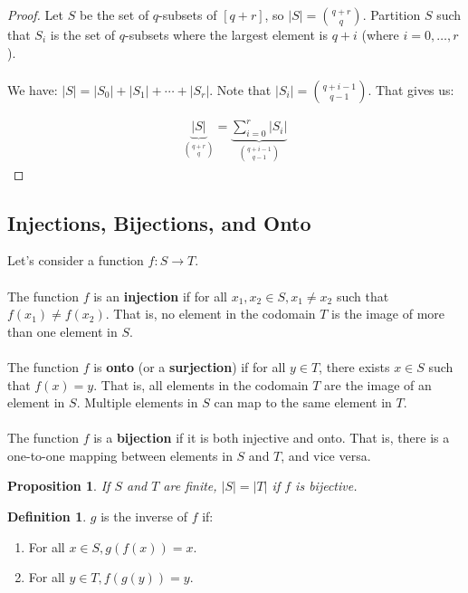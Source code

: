 \documentclass[]{article}
\newtheorem{proposition}{Proposition}[section]
\theoremstyle{definition}
\newtheorem{defn}{Definition}[section]
\newcommand{\lecture}[1]{\marginpar{{\footnotesize $\leftarrow$ \underline{#1}}}}
\begin{document}
				\begin{proof}
					Let $S$ be the set of $q$-subsets of $[q + r]$, so $|S| = {q + r \choose q}$. Partition $S$ such that $S_i$ is the set of $q$-subsets where the largest element is $q + i$ (where $i = 0, \ldots, r$).
					\\ \\
					We have: $|S| = |S_0| + |S_1| + \cdots + |S_r|$. Note that $|S_i| = {q + i - 1 \choose q - 1}$. That gives us:
					
					\begin{align*}
						\underbrace{|S|}_{{q + r \choose q}} = \underbrace{\sum_{i = 0}^{r} |S_i|}_{{q + i - 1 \choose q - 1}}
					\end{align*}
				\end{proof}
		
		\subsection{Injections, Bijections, and Onto} \lecture{January 11, 2013}
			Let's consider a function $f: S \to T$.
			\\ \\
			The function $f$ is an \textbf{injection} if for all $x_1, x_2 \in S, x_1 \ne x_2$ such that $f(x_1) \ne f(x_2)$. That is, no element in the codomain $T$ is the image of more than one element in $S$.
			\\ \\
			The function $f$ is \textbf{onto} (or a \textbf{surjection}) if for all $y \in T$, there exists $x \in S$ such that $f(x) = y$. That is, all elements in the codomain $T$ are the image of an element in $S$. Multiple elements in $S$ can map to the same element in $T$.
			\\ \\
			The function $f$ is a \textbf{bijection} if it is both injective and onto. That is, there is a one-to-one mapping between elements in $S$ and $T$, and vice versa.
			
			\begin{proposition}
				If $S$ and $T$ are finite, $|S| = |T|$ if $f$ is bijective.
			\end{proposition}
			
			\begin{defn}
				$g$ is the inverse of $f$ if:
				\begin{enumerate}
					\item For all $x \in S, g(f(x)) = x$.
					\item For all $y \in T, f(g(y)) = y$.
				\end{enumerate}
			\end{defn}
			
\end{document}

